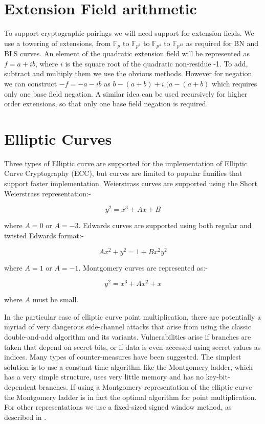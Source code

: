 \documentclass{llncs}
\newcommand{\F}{\mathbb{F}}
\begin{document}
\section{Extension Field arithmetic}

To support cryptographic pairings we will need support for extension fields. We use a towering of extensions, from $\F_p$ to $\F_{p^2}$ to $\F_{p^4}$ to $\F_{p^{12}}$ as required for 
BN \cite{barreto-naehrig} and BLS \cite{barreto-lynn-scott} curves. An element 
of the quadratic extension field will be represented as $f=a+ib$, where $i$ is the square root of the quadratic non-residue -1.
To add, subtract and multiply them we use the obvious methods. However for negation we can construct $-f=-a-ib$ as $b-(a+b)+i.(a-(a+b)$ which requires only one base field negation. A similar idea 
can be used recursively for higher order extensions, so that only one base field negation is required.


\section{Elliptic Curves}

Three types of Elliptic curve are supported for the implementation of Elliptic Curve Cryptography (ECC), but curves are limited to popular families that support faster implementation. Weierstrass 
curves are supported using the Short Weierstrass representation:-

$$ y^2=x^3+Ax+B $$

where $A=0$ or $A=-3$. Edwards curves are supported using both regular and twisted Edwards format:-

$$ Ax^2+y^2=1+Bx^2y^2 $$

where $A=1$ or $A=-1$. Montgomery curves are represented as:-

$$ y^2=x^3+Ax^2+x $$

where $A$ must be small.

In the particular case of elliptic curve point multiplication, there are potentially a myriad of very dangerous side-channel attacks that arise from using the classic double-and-add algorithm
and its variants. Vulnerabilities arise if branches are taken that depend on secret bits, or if data is even accessed using secret values as indices.
Many types of counter-measures have been suggested. The simplest solution is to use a constant-time algorithm like the Montgomery ladder, which has a very simple structure, uses very little 
memory and has no key-bit-dependent branches. 
If using a Montgomery representation of the elliptic curve the Montgomery ladder \cite{montgomery2} is in fact the optimal algorithm for point multiplication. For other representations we use a 
fixed-sized signed window method, as described in \cite{bos-costello-longa-naehrig}. 
\end{document}
